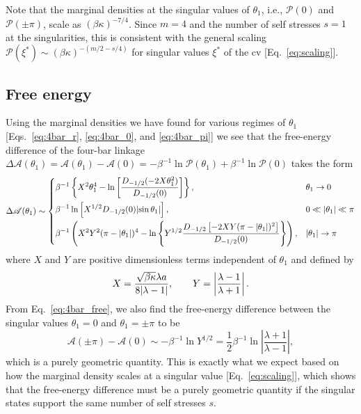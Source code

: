 Note that the marginal densities at the singular values of $\theta_{1}$, i.e., $\mathscr{P}(0)$ and $\mathscr{P}(\pm\pi)$, scale as $(\beta\kappa)^{-7/4}$.
Since $m = 4$ and the number of self stresses $s = 1$ at the singularities, this is consistent with the general scaling $\mathscr{P}(\xi^{*}) \sim (\beta\kappa)^{-(m/2 - s/4)}$ for singular values $\xi^{*}$ of the \ac{cv} [Eq.~\eqref{eq:scaling}].

\subsection{Free energy}

Using the marginal densities we have found for various regimes of $\theta_{1}$ [Eqs.~\eqref{eq:4bar_r}, \eqref{eq:4bar_0}, and \eqref{eq:4bar_pi}] we see that the free-energy difference of the four-bar linkage $\Delta\mathscr{A}(\theta_1) = \mathscr{A}(\theta_1) - \mathscr{A}(0) = -\beta^{-1}\ln{\mathscr{P}(\theta_1)} + \beta^{-1}\ln{\mathscr{P}(0)}$ takes the form
%
\begin{equation}
  \Delta\mathscr{A}(\theta_1) \sim
\begin{dcases}
  \beta^{-1}\left\{X^2\theta_1^4 - \ln\left[\dfrac{D_{-1/2}(-2X\theta_1^2)}{D_{-1/2}(0)}\right]\right\}, & \theta_1 \to 0\\
  \beta^{-1}\ln\left[X^{1/2}D_{-1/2}(0)\lvert\sin{\theta_1}\rvert\right], & 0 \ll \lvert\theta_1\rvert \ll \pi\\
  \beta^{-1}\left(X^2Y^2(\pi - \lvert\theta_1\rvert)^4 - \ln\left\{Y^{1/2}\dfrac{D_{-1/2}\left[-2XY(\pi - \lvert\theta_1\rvert)^2\right]}{D_{-1/2}(0)}\right\}\right), & \lvert\theta_1\rvert \to \pi
\end{dcases}
  \label{eq:4bar_free}
\end{equation}
%
where $X$ and $Y$ are positive dimensionless terms independent of $\theta_1$ and defined by
%
\begin{equation}
  X = \frac{\sqrt{\beta\kappa}\lambda a}{8\lvert\lambda-1\rvert},\qquad
  Y = \left|\frac{\lambda-1}{\lambda+1}\right|.
\end{equation}
%
From Eq.~\eqref{eq:4bar_free}, we also find the free-energy difference between the singular values $\theta_{1} = 0$ and $\theta_{1} = \pm\pi$ to be
%
\begin{equation}
  \mathscr{A}(\pm\pi) - \mathscr{A}(0) \sim -\beta^{-1}\ln{Y^{1/2}} = \frac{1}{2}\beta^{-1}\ln\left|\frac{\lambda + 1}{\lambda - 1}\right|,
\end{equation}
%
which is a purely geometric quantity.
This is exactly what we expect based on how the marginal density scales at a singular value [Eq.~\eqref{eq:scaling}], which shows that the free-energy difference must be a purely geometric quantity if the singular states support the same number of self stresses $s$.
